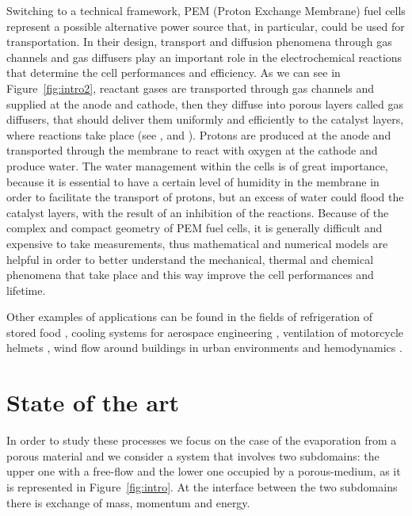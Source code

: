 Switching to a technical framework, PEM (Proton Exchange Membrane) fuel cells 
represent a possible alternative power source that, in particular, could be 
used for transportation. In their design, transport and diffusion phenomena 
through gas channels and gas diffusers play an important role in the 
electrochemical reactions that determine the cell performances and efficiency. 
As we can see in Figure~\ref{fig:intro2}, reactant gases are transported 
through gas channels and supplied at the anode and cathode, then they diffuse 
into porous layers called gas diffusers, that should deliver them uniformly and 
efficiently to the catalyst layers, where reactions take place (see 
\cite{wu:fuelcell}, \cite{tesi:baber} and \cite{tesi:pem}). Protons are 
produced at the anode and transported through the membrane to react with oxygen 
at the cathode and produce water. The water management within the cells is of 
great importance, because it is essential to have a certain level of humidity in 
the membrane in order to facilitate the transport of protons, but an excess of 
water could flood the catalyst layers, with the result of an inhibition of the 
reactions.
Because of the complex and compact geometry of PEM fuel cells, it is generally 
difficult and expensive to take measurements, thus mathematical and numerical 
models are helpful in order to better understand the mechanical, thermal and 
chemical phenomena that take place and this way improve the cell performances 
and lifetime.

Other examples of applications can be found in the fields of refrigeration of 
stored food \cite{intro:food}, cooling systems for aerospace engineering 
\cite{intro:aero}, ventilation of motorcycle helmets \cite{intro:discacim}, 
wind flow around buildings in urban environments \cite{intro:buildings} and 
hemodynamics \cite{intro:med}.

\section{State of the art}
In order to study these processes we focus on
the case of the evaporation from a porous material and we consider
a system that 
involves two subdomains: the upper one with a free-flow and the lower one 
occupied by a porous-medium, as it is represented in Figure~\ref{fig:intro}.
At the interface between the two subdomains there is exchange of mass, momentum 
and energy.

